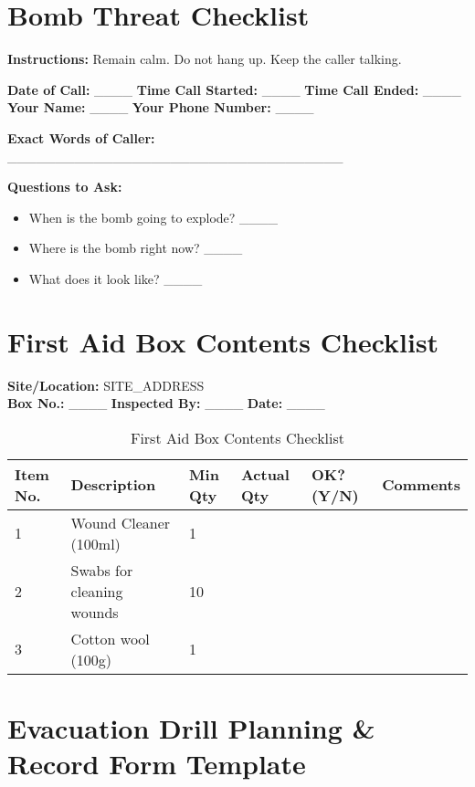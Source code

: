 \documentclass[12pt]{article}
\begin{document}
\section{Bomb Threat Checklist}

\textbf{Instructions:} Remain calm. Do not hang up. Keep the caller talking.

\textbf{Date of Call:} \_\_\_\_ \textbf{Time Call Started:} \_\_\_\_ \textbf{Time Call Ended:} \_\_\_\_\\
\textbf{Your Name:} \_\_\_\_ \textbf{Your Phone Number:} \_\_\_\_

\textbf{Exact Words of Caller:}\\
\_\_\_\_\_\_\_\_\_\_\_\_\_\_\_\_\_\_\_\_\_\_\_\_\_\_\_\_\_\_\_\_\_\_\_

\textbf{Questions to Ask:}
\begin{itemize}
    \item When is the bomb going to explode? \_\_\_\_
    \item Where is the bomb right now? \_\_\_\_
    \item What does it look like? \_\_\_\_
\end{itemize}

\section{First Aid Box Contents Checklist}

\textbf{Site/Location:} {{SITE_ADDRESS}}\\
\textbf{Box No.:} \_\_\_\_ \textbf{Inspected By:} \_\_\_\_ \textbf{Date:} \_\_\_\_

\begin{table}[h]
    \centering
    \begin{tabular}{p{3cm}p{6cm}p{2cm}p{2cm}p{2cm}p{3cm}}
        \toprule
        \textbf{Item No.} & \textbf{Description} & \textbf{Min Qty} & \textbf{Actual Qty} & \textbf{OK? (Y/N)} & \textbf{Comments} \\
        \midrule
        1 & Wound Cleaner (100ml) & 1 & & & \\
        2 & Swabs for cleaning wounds & 10 & & & \\
        3 & Cotton wool (100g) & 1 & & & \\
        \bottomrule
    \end{tabular}
    \caption{First Aid Box Contents Checklist}
\end{table}

\section{Evacuation Drill Planning \& Record Form Template}
\end{document}
